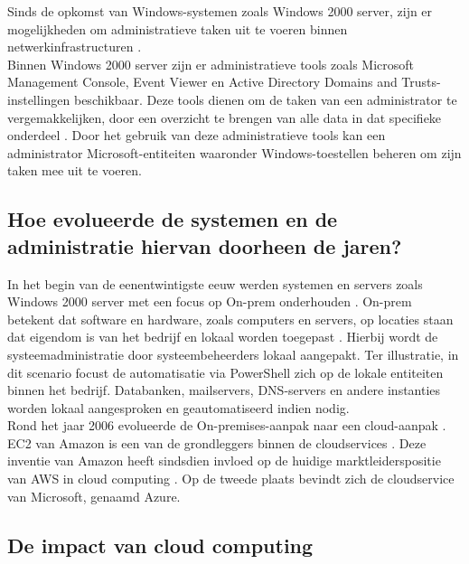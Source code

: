 Sinds de opkomst van Windows-systemen zoals Windows 2000 server, zijn er mogelijkheden om administratieve taken uit te voeren binnen netwerkinfrastructuren \autocite{Tulloch2001}. \\

Binnen Windows 2000 server zijn er administratieve tools zoals Microsoft Management Console, Event Viewer en Active Directory Domains and Trusts-instellingen beschikbaar. Deze tools dienen om de taken van een administrator te vergemakkelijken, door een overzicht te brengen van alle data in dat specifieke onderdeel \autocite{Sibisi2022}. Door het gebruik van deze administratieve tools kan een administrator Microsoft-entiteiten waaronder Windows-toestellen beheren om zijn taken mee uit te voeren. 

\subsection{Hoe evolueerde de systemen en de administratie hiervan doorheen de jaren?}


In het begin van de eenentwintigste eeuw werden systemen en servers zoals Windows 2000 server met een focus op \ac{On-prem} onderhouden \autocite{Microsoft2022a}. \ac{On-prem} betekent dat software en hardware, zoals computers en servers, op locaties staan dat eigendom is van het bedrijf en lokaal worden toegepast \autocite{Gastermann2015}. Hierbij wordt de systeemadministratie door systeembeheerders lokaal aangepakt. Ter illustratie, in dit scenario focust de automatisatie via PowerShell zich op de lokale entiteiten binnen het bedrijf. Databanken, mailservers, \ac{DNS}-servers en andere instanties worden lokaal aangesproken en geautomatiseerd indien nodig. \\

Rond het jaar 2006 evolueerde de On-premises-aanpak naar een cloud-aanpak \autocite{Hayes2008}. EC2 van Amazon is een van de grondleggers binnen de cloudservices \autocite{Qian2009}. Deze inventie van Amazon heeft sindsdien invloed op de huidige marktleiderspositie van AWS in cloud computing \autocite{Vailshery2022}. Op de tweede plaats bevindt zich de cloudservice van Microsoft, genaamd Azure.

\subsection{De impact van cloud computing}


